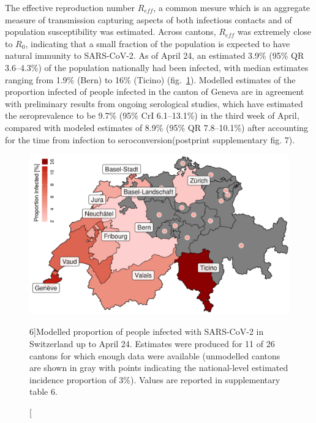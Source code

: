 The effective reproduction number $R_{eff}$, a common mesure which is an aggregate measure of transmission capturing aspects of both infectious contacts and of population susceptibility was estimated. Across cantons, $R_{eff}$ was extremely close to $R_0$, indicating that a small fraction of the population is expected to have natural immunity to SARS-CoV-2. 
As of April 24, an estimated 3.9\% (95\% QR 3.6–4.3\%) of the population nationally had been infected, with median estimates ranging from 1.9\% (Bern) to 16\% (Ticino) (fig.~\ref{fig:covid-ch-map}). 
Modelled estimates of the proportion infected of people infected in the canton of Geneva are in agreement with preliminary results from ongoing serological studies, which have estimated the seroprevalence to be 9.7\% (95\% CrI 6.1–13.1\%) in the third week of April\cite[4.5\baselineskip]{Stringhini:RepeatedSeroprevalenceAntiSARSCoV2:2020}, compared with modeled estimates of 8.9\% (95\% QR 7.8–10.1\%) after accounting for the time from infection to seroconversion\cite{Wolfel:VirologicalAssessmentHospitalized:2020}(postprint supplementary fig. 7).

\begin{figure}\centering
  \includegraphics[width=\textwidth]{fig_covid-switzerland-npi/FIGURE_5_mod.png}
  \caption[Modelled proportion of people infected with SARS-CoV-2 in Switzerland][6\baselineskip]{Modelled proportion of people infected with SARS-CoV-2 in Switzerland up to April 24. Estimates were produced for 11 of 26 cantons for which enough data were available (unmodelled cantons are shown in gray with points indicating the national-level estimated incidence proportion of 3\%). Values are reported in supplementary table 6.}
  \label{fig:covid-ch-map}
\end{figure}

